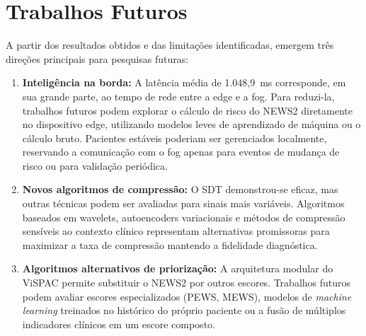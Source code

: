 \documentclass[twoside,english,brazilian]{UNISINOSmonografia}
\begin{document}
\section{Trabalhos Futuros}
\label{sec:trabalhos_futuros}
A partir dos resultados obtidos e das limitações identificadas, emergem três direções principais para pesquisas futuras:
\begin{enumerate}
    \item \textbf{Inteligência na borda:} A latência média de 1.048,9~ms corresponde, em sua grande parte, ao tempo de rede entre a edge e a fog. Para reduzi-la, trabalhos futuros podem explorar o cálculo de risco do NEWS2 diretamente no dispositivo edge, utilizando modelos leves de aprendizado de máquina ou o cálculo bruto. Pacientes estáveis poderiam ser gerenciados localmente, reservando a comunicação com o fog apenas para eventos de mudança de risco ou para validação periódica.
    
    \item \textbf{Novos algoritmos de compressão:} O SDT demonstrou-se eficaz, mas outras técnicas podem ser avaliadas para sinais mais variáveis. Algoritmos baseados em wavelets, autoencoders variacionais e métodos de compressão sensíveis ao contexto clínico representam alternativas promissoras para maximizar a taxa de compressão mantendo a fidelidade diagnóstica.
    
    \item \textbf{Algoritmos alternativos de priorização:} A arquitetura modular do ViSPAC permite substituir o NEWS2 por outros escores. Trabalhos futuros podem avaliar escores especializados (PEWS, MEWS), modelos de \textit{machine learning} treinados no histórico do próprio paciente ou a fusão de múltiplos indicadores clínicos em um escore composto.
\end{enumerate}


\end{document}
